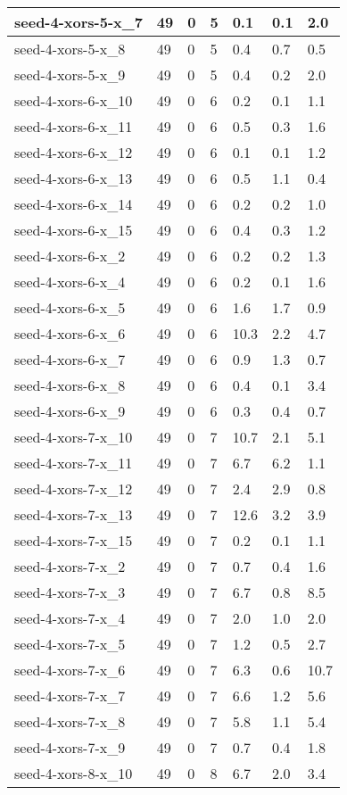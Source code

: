 \begin{scriptsize}
\begin{longtable}{|p{5cm}|l|l|l|l|l|l|}
seed-4-xors-5-x\_7&49&0&5&0.1&0.1&2.0 \\ \hline 
seed-4-xors-5-x\_8&49&0&5&0.4&0.7&0.5 \\ \hline 
seed-4-xors-5-x\_9&49&0&5&0.4&0.2&2.0 \\ \hline 
seed-4-xors-6-x\_10&49&0&6&0.2&0.1&1.1 \\ \hline 
seed-4-xors-6-x\_11&49&0&6&0.5&0.3&1.6 \\ \hline 
seed-4-xors-6-x\_12&49&0&6&0.1&0.1&1.2 \\ \hline 
seed-4-xors-6-x\_13&49&0&6&0.5&1.1&0.4 \\ \hline 
seed-4-xors-6-x\_14&49&0&6&0.2&0.2&1.0 \\ \hline 
seed-4-xors-6-x\_15&49&0&6&0.4&0.3&1.2 \\ \hline 
seed-4-xors-6-x\_2&49&0&6&0.2&0.2&1.3 \\ \hline 
seed-4-xors-6-x\_4&49&0&6&0.2&0.1&1.6 \\ \hline 
seed-4-xors-6-x\_5&49&0&6&1.6&1.7&0.9 \\ \hline 
seed-4-xors-6-x\_6&49&0&6&10.3&2.2&4.7 \\ \hline 
seed-4-xors-6-x\_7&49&0&6&0.9&1.3&0.7 \\ \hline 
seed-4-xors-6-x\_8&49&0&6&0.4&0.1&3.4 \\ \hline 
seed-4-xors-6-x\_9&49&0&6&0.3&0.4&0.7 \\ \hline 
seed-4-xors-7-x\_10&49&0&7&10.7&2.1&5.1 \\ \hline 
seed-4-xors-7-x\_11&49&0&7&6.7&6.2&1.1 \\ \hline 
seed-4-xors-7-x\_12&49&0&7&2.4&2.9&0.8 \\ \hline 
seed-4-xors-7-x\_13&49&0&7&12.6&3.2&3.9 \\ \hline 
seed-4-xors-7-x\_15&49&0&7&0.2&0.1&1.1 \\ \hline 
seed-4-xors-7-x\_2&49&0&7&0.7&0.4&1.6 \\ \hline 
seed-4-xors-7-x\_3&49&0&7&6.7&0.8&8.5 \\ \hline 
seed-4-xors-7-x\_4&49&0&7&2.0&1.0&2.0 \\ \hline 
seed-4-xors-7-x\_5&49&0&7&1.2&0.5&2.7 \\ \hline 
seed-4-xors-7-x\_6&49&0&7&6.3&0.6&10.7 \\ \hline 
seed-4-xors-7-x\_7&49&0&7&6.6&1.2&5.6 \\ \hline 
seed-4-xors-7-x\_8&49&0&7&5.8&1.1&5.4 \\ \hline 
seed-4-xors-7-x\_9&49&0&7&0.7&0.4&1.8 \\ \hline 
seed-4-xors-8-x\_10&49&0&8&6.7&2.0&3.4 \\ \hline 

\end{longtable}
\end{scriptsize}
